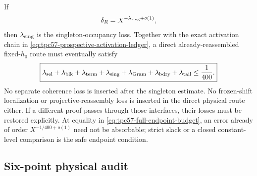 If
\begin{equation}
 \delta_R=X^{-\lambda_{\rm sing}+o(1)},
 \label{eq:tpc57-singleton-loss-exponent}
\end{equation}
then \(\lambda_{\rm sing}\) is the singleton-occupancy loss.  Together with
the exact activation chain in
\eqref{eq:tpc57-prospective-activation-ledger}, a direct already-reassembled
fixed-\(h_0\) route must eventually satisfy
\begin{equation}
 \boxed{
 \lambda_{\rm sel}+\lambda_{\rm blk}
 +\lambda_{\rm term}+\lambda_{\rm sing}
 +\lambda_{\rm Gram}+\lambda_{\rm bdry}+\lambda_{\rm tail}
 \le\frac1{400}.}
 \label{eq:tpc57-full-endpoint-budget}
\end{equation}
No separate coherence loss is inserted after the singleton estimate.  No
frozen-shift localization or projective-reassembly loss is inserted in the
direct physical route either.  If a different proof passes through those
interfaces, their losses must be restored explicitly.  At equality in
\eqref{eq:tpc57-full-endpoint-budget}, an error already of order
\(X^{-1/400+o(1)}\) need not be absorbable; strict slack or a closed
constant-level comparison is the safe endpoint condition.

\subsection{Six-point physical audit}

